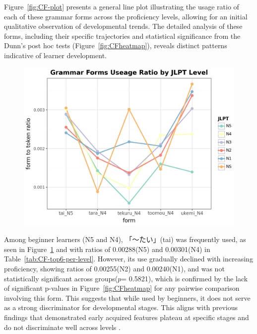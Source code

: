 Figure~\ref{fig:CF-plot} presents a general line plot illustrating the usage ratio of each of these grammar forms
across the proficiency levels, allowing for an initial qualitative observation of developmental trends. The detailed
analysis of these forms, including their specific trajectories and statistical significance from the Dunn's post hoc
tests (Figure~\ref{fig:CFheatmap}), reveals distinct patterns indicative of learner development.


\begin{figure}[h]
\centering
\includegraphics[scale=.5]{img/CF-plot}
\caption[The use of the top 5 frequently used grammar forms across JLPT levels]{}
\label{fig:CFplot}
\end{figure}


Among beginner learners (N5 and N4), 「〜たい」(tai) was frequently used, as seen in Figure~\ref{fig:CFplot} and with
ratios of 0.00288(N5) and 0.00301(N4) in Table~\ref{tab:CF-top6-per-level}.
However, its
use gradually declined
with
increasing proficiency, showing ratios of 0.00255(N2) and 0.00240(N1), and was not statistically significant across
groups($p$=
0.5821),
which is confirmed by the
lack of
significant p-values in Figure~\ref{fig:CFheatmap} for any pairwise comparison involving this form. This suggests that
while used by beginners, it does not serve as a strong discriminator for developmental stages. This aligns
with previous
findings that demonstrated early acquired features plateau at specific stages and do not discriminate well across
levels \citep{Ortega2003}.


